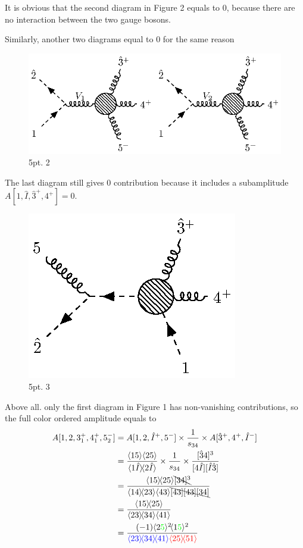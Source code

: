 \documentclass[12pt]{article}
\newcommand{\mdavg}[2]{\langle #1 \rangle\!\langle #2 \rangle}
\newcommand{\avg}[1]{\langle #1 \rangle}
\newcommand{\doubleavg}[2]{\left\langle #1 \right\rangle\!\left\langle #2 \right\rangle}
\begin{document}
It is obvious that the second diagram in Figure 2 equals to 0, because there are no interaction between the two gauge bosons.
\par
Similarly, another two diagrams equal to 0 for the same reason
\begin{figure}
    \centering
    \includegraphics{5pt2.eps}
    \caption{5pt. 2}
    \label{3}
\end{figure}
\par
The last diagram still gives 0 contribution because it includes a subamplitude $A[1,\hat{I},\hat{3}^+,4^+]=0$.
\par
\begin{figure}[H]
    \centering
    \includegraphics{5pt3.eps}
    \caption{5pt. 3}
    \label{4}
\end{figure}
Above all. only the first diagram in Figure 1 has non-vanishing contributions, so the full color ordered amplitude equals to
\begin{align*}
    A[1,2,3_1^+,4_1^+,5_2^-]&=A[1,2,\hat{I}^+,5^-]\times\frac{1}{s_{34}}\times A[\hat{3}^+,4^+,\hat{I}^-]\\
    &=\frac{\doubleavg{15}{25}}{\mdavg{1\hat{I}}{2\hat{I}}}\times\frac{1}{s_{34}}\times\frac{[\hat{3}4]^3}{[4\hat{I}][\hat{I}\hat{3}]}\\
    &=\frac{\mdavg{15}{25}\bcancel{[34]^3}}{\mdavg{14}{23}\avg{43}\bcancel{[43][43][34]}}\\
    &=\frac{\mdavg{15}{25}}{\mdavg{23}{34}\avg{41}}\\
    &=\frac{(-1)\avg{2\textcolor{green}{5}}^2\!\avg{1\textcolor{green}{5}}^2}{\textcolor{blue}{\mdavg{23}{34}\!\avg{41}}\textcolor{red}{\mdavg{25}{51}}}
\end{align*}
\end{document}
